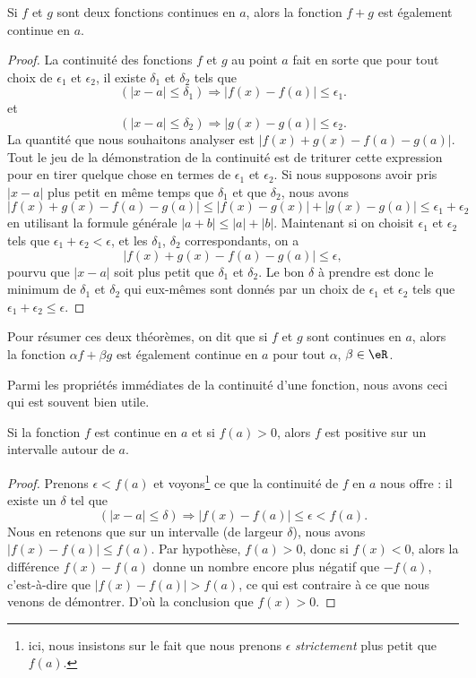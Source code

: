 \begin{theorem}
Si $f$ et $g$ sont deux fonctions continues en $a$, alors la fonction $f+g$ est également continue en $a$.
\end{theorem}

\begin{proof}
La continuité des fonctions $f$ et $g$ au point $a$ fait en sorte que pour tout choix de $\epsilon_1$ et $\epsilon_2$, il existe $\delta_1$ et $\delta_2$ tels que
\[
  (| x-a |\leq \delta_1)\Rightarrow | f(x)-f(a) |\leq \epsilon_1.
\]
et
\[
  (| x-a |\leq \delta_2)\Rightarrow | g(x)-g(a) |\leq \epsilon_2.
\]
La quantité que nous souhaitons analyser est $| f(x)+g(x)-f(a)-g(a) |$. Tout le jeu de la démonstration de la continuité est de triturer cette expression pour en tirer quelque chose en termes de $\epsilon_1$ et $\epsilon_2$. Si nous supposons avoir pris $| x-a |$ plus petit en même temps que $\delta_1$ et que $\delta_2$, nous avons
\[
| f(x)+g(x)-f(a)-g(a) |\leq| f(x)-g(x) |+| g(x)-g(a) |\leq\epsilon_1+\epsilon_2
\]
en utilisant la formule générale $| a+b |\leq | a |+| b |$. Maintenant si on choisit $\epsilon_1$ et $\epsilon_2$ tels que $\epsilon_1+\epsilon_2<\epsilon$, et les $\delta_1$, $\delta_2$ correspondants, on a
\[
| f(x)+g(x)-f(a)-g(a) |\leq\epsilon,
\]
pourvu que $| x-a |$ soit plus petit que $\delta_1$ et $\delta_2$. Le bon $\delta$ à prendre est donc le minimum de $\delta_1$ et $\delta_2$ qui eux-mêmes sont donnés par un choix de $\epsilon_1$ et $\epsilon_2$ tels que $\epsilon_1+\epsilon_2\leq\epsilon$.
\end{proof}

Pour résumer ces deux théorèmes, on dit que si $f$ et $g$ sont continues en $a$, alors la fonction $\alpha f+\beta g$ est également continue en $a$ pour tout $\alpha$, $\beta\in\eR$.

Parmi les propriétés immédiates de la continuité d'une fonction, nous avons ceci qui est souvent bien utile.

\begin{corollary}   \label{CorNNPYooMbaYZg}
Si la fonction $f$ est continue en $a$ et si $f(a)>0$, alors $f$ est positive sur un intervalle autour de $a$.
\end{corollary}

\begin{proof}
Prenons $\epsilon<f(a)$ et voyons\footnote{ici, nous insistons sur le fait que nous prenons $\epsilon$ \emph{strictement} plus petit que $f(a)$.} ce que la continuité de $f$ en $a$ nous offre : il existe un $\delta$ tel que
\[
  (| x-a |\leq \delta)\Rightarrow | f(x)-f(a) |\leq\epsilon < f(a).
\]
Nous en retenons que sur un intervalle (de largeur $\delta$), nous avons $| f(x)-f(a) |\leq f(a)$. Par hypothèse, $f(a)>0$, donc si $f(x)<0$, alors la différence $f(x)-f(a)$ donne un nombre encore plus négatif que $-f(a)$, c'est-à-dire que $| f(x)-f(a) |>f(a)$, ce qui est contraire à ce que nous venons de démontrer. D'où la conclusion que $f(x)>0$.
\end{proof}

